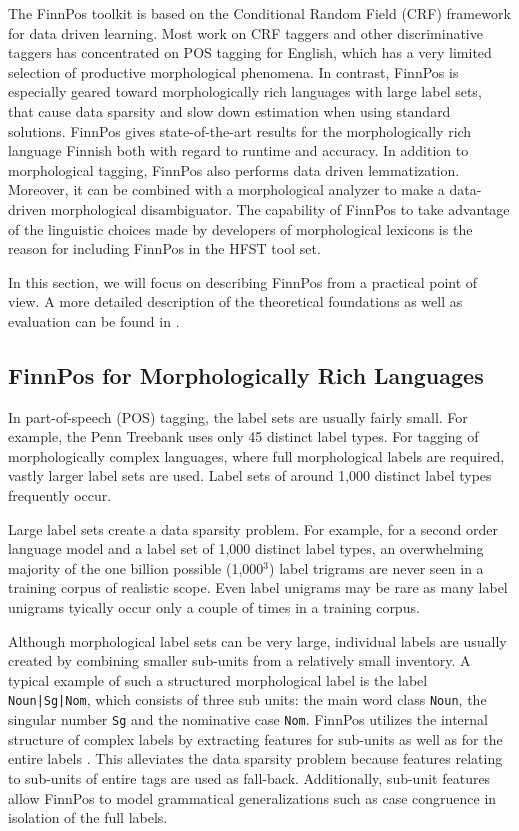 \documentclass{llncs}
\begin{document}
The FinnPos toolkit is based on the Conditional Random Field (CRF) framework
\cite{lafferty/2001} for data driven learning. Most work on CRF
taggers and other discriminative taggers has concentrated on POS
tagging for English, which has a very limited selection of productive
morphological phenomena. In contrast, FinnPos is especially geared
toward morphologically rich languages with large label sets, that
cause data sparsity and slow down estimation when using standard
solutions. FinnPos gives state-of-the-art results for the
morphologically rich language Finnish \cite{silfverberg/2015} both
with regard to runtime and accuracy.  In addition to morphological tagging, 
FinnPos also performs data driven lemmatization. 
Moreover, it can be combined with a morphological analyzer 
to make a data-driven morphological disambiguator. 
The capability of FinnPos to take advantage of the linguistic choices 
made by developers of morphological lexicons is the reason for including 
FinnPos in the HFST tool set.

In this section, we will focus on describing FinnPos from a
practical point of view. A more detailed description of the theoretical foundations 
as well as evaluation can be found in
\cite{silfverberg/2015}.

\subsection{FinnPos for Morphologically Rich Languages}

In part-of-speech (POS) tagging, the label sets are usually fairly small. For example,
the Penn Treebank uses only 45 distinct label types. For tagging of
morphologically complex languages, where full morphological labels are
required, vastly larger label sets are used. Label sets of around 1,000
distinct label types frequently occur. 

Large label sets create a data sparsity problem. For example, for a
second order language model and a label set of 1,000 distinct label types, an
overwhelming majority of the one billion possible (1,000$^3$) label
trigrams are never seen in a training corpus of realistic scope. Even
label unigrams may be rare as many label unigrams tyically occur only a couple 
of times in a training corpus.

Although morphological label sets can be very large, individual labels
are usually created by combining smaller sub-units from a relatively
small inventory. A typical example of such a structured morphological
label is the label {\tt Noun|Sg|Nom}, which consists of three sub
units: the main word class {\tt Noun}, the singular number {\tt Sg}
and the nominative case {\tt Nom}. FinnPos utilizes the internal
structure of complex labels by extracting features for sub-units as
well as for the entire labels \cite{silfverberg/2014}. This alleviates
the data sparsity problem because features relating to sub-units of
entire tags are used as fall-back. Additionally, sub-unit features
allow FinnPos to model grammatical generalizations such as case
congruence in isolation of the full labels.
\end{document}
